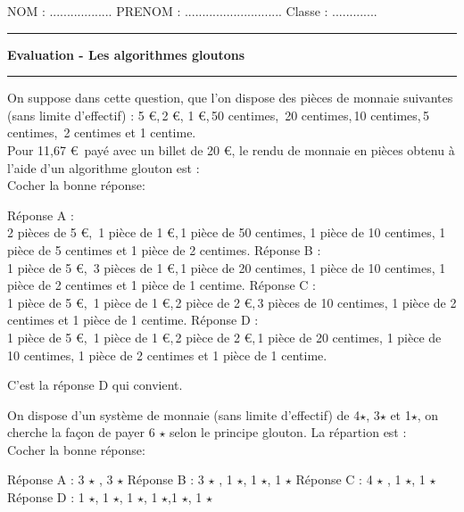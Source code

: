 \documentclass[a4paper,12,%
]{exam}
\begin{document}
\chead{}

\lfoot{                      }
NOM : .................. \hfill PRENOM : ............................ \hfill Classe : .............\\
\hrule

\begin{center}
	\textbf{\Large{Evaluation - Les algorithmes gloutons }}\end{center}
\hrule
\vskip0.5cm
	\begin{questions}
	\question On suppose dans cette question, que l'on dispose des pièces de monnaie suivantes (sans limite d'effectif) : 5 \euro,\,2 \euro, 1 \euro,\,50 centimes, \,20 centimes,\,10 centimes,\,5 centimes, \,2 centimes et 1 centime.\\
	Pour 11,67 \euro\, payé avec un billet de 20 \euro, le rendu de monnaie en pièces obtenu à l'aide d'un algorithme glouton est : \\
	Cocher la bonne réponse:
			\begin{checkboxes}
			\choice Réponse A :\\
			2 pièces de 5 \euro, \,1 pièce de 1 \euro,\,1 pièce de 50 centimes, 1 pièce de 10 centimes, 1 pièce de 5 centimes et 1 pièce de 2 centimes.
			\choice Réponse B :\\
			1 pièce de 5 \euro, \,3 pièces de 1 \euro,\,1 pièce de 20 centimes, 1 pièce de 10 centimes, 1 pièce de 2 centimes et 1 pièce de 1 centime.
			\choice Réponse C : \\
			1 pièce de 5 \euro, \,1 pièce de 1 \euro,\,2 pièce de 2 \euro,\,3 pièces de 10 centimes, 1 pièce de 2 centimes et 1 pièce de 1 centime.
			\choice Réponse D :\\ 1 pièce de 5 \euro, \,1 pièce de 1 \euro,\,2 pièce de 2 \euro,\,1 pièce de 20 centimes, 1 pièce de 10 centimes,  1 pièce de 2 centimes et 1 pièce de 1 centime.
		\end{checkboxes}	

\begin{solution}
C'est la réponse D qui  convient.

\end{solution}
\medskip
	\question On dispose d'un système de monnaie (sans limite d'effectif) de 4$\star$, 3$\star$ et 1$\star$, on cherche la façon de payer 6 $\star$ selon le principe glouton. La répartion est : \\
Cocher la bonne réponse:
\begin{checkboxes}
	\choice Réponse A : 3 $\star$ , 3 $\star$
	\choice Réponse B : 3 $\star$ , 1 $\star$, 1 $\star$, 1 $\star$
	\choice Réponse C : 4 $\star$ , 1 $\star$, 1 $\star$
		\choice Réponse D : 1 $\star$, 1 $\star$, 1 $\star$, 1 $\star$,1 $\star$, 1 $\star$
\end{checkboxes}		


\end{questions}
\end{document}
